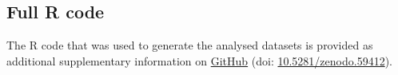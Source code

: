\subsection{Full R code}
The R code that was used to generate the analysed datasets is provided as additional supplementary information on \href{https://github.com/koenvanbenthem/Disentangling_Dynamics_IBM}{GitHub} (doi: \href{https://doi.org/10.5281/zenodo.59412}{10.5281/zenodo.59412}).